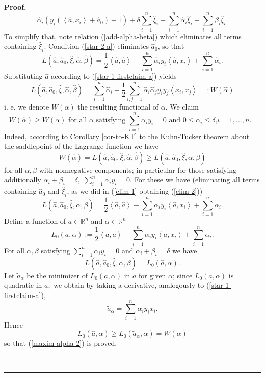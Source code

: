 \documentclass[11pt,twoside]{article}%
\theoremstyle{change}
\newenvironment{proof}[1][Proof]{\textbf{#1.} }{\ \rule{0.5em}{0.5em}}
\begin{document}
\begin{proof}
\begin{equation}
\hat{\alpha}_{i}\left(  y_{i}\left(  \left\langle \hat{a},x_{i}\right\rangle
+\hat{a}_{0}\right)  -1\right)  +\delta\sum_{i=1}^{n}\hat{\xi}_{i}-\sum
_{i=1}^{n}\hat{\alpha}_{i}\hat{\xi}_{i}-\sum_{i=1}^{n}\hat{\beta}_{i}\hat{\xi
}_{i}.\label{elim-1}%
\end{equation}
To simplify that, note relation (\ref{add-alpha-beta}) which eliminates all
terms containing $\hat{\xi}_{i}$. Condition (\ref{star-2-a}) eliminates
$\hat{a}_{0}$, so that
\begin{equation}
L\left(  \hat{a},\hat{a}_{0},\hat{\xi},\hat{\alpha},\hat{\beta}\right)
=\frac{1}{2}\left\langle \hat{a},\hat{a}\right\rangle -\sum_{i=1}^{n}%
\hat{\alpha}_{i}y_{i}\left\langle \hat{a},x_{i}\right\rangle +\sum_{i=1}%
^{n}\hat{\alpha}_{i}.\label{elim-2}%
\end{equation}
Substituting $\hat{a}$ according to (\ref{star-1-firstclaim-a}) yields
\[
L\left(  \hat{a},\hat{a}_{0},\hat{\xi},\hat{\alpha},\hat{\beta}\right)
=\sum_{i=1}^{n}\hat{\alpha}_{i}-\frac{1}{2}\sum_{i,j=1}^{n}\hat{\alpha}%
_{i}\hat{\alpha}_{j}y_{i}y_{j}\left\langle x_{i},x_{j}\right\rangle
=:W(\hat{\alpha})
\]
i. e. we denote $W(\alpha)$ the resulting functional of $\alpha$. We claim
\begin{equation}
W(\hat{\alpha})\geq W(\alpha)\text{ for all }\alpha\text{ satisfying }%
\sum_{i=1}^{n}\alpha_{i}y_{i}=0\text{ and }0\leq\alpha_{i}\leq\delta\text{,
}i=1,\ldots,n.\text{ }\label{maxim-alpha-2}%
\end{equation}
Indeed, according to Corollary \ref{cor-to-KT} to the Kuhn-Tucker theorem
about the saddlepoint of the Lagrange function we have
\[
W(\hat{\alpha})=L\left(  \hat{a},\hat{a}_{0},\hat{\xi},\hat{\alpha},\hat
{\beta}\right)  \geq L\left(  \hat{a},\hat{a}_{0},\hat{\xi},\alpha
,\beta\right)
\]
for all $\alpha,\beta$ with nonnegative components; in particular for those
satisfying additionally $\alpha_{i}+\beta_{i}=\delta,$ $\sum_{i=1}^{n}%
\alpha_{i}y_{i}=0$. For these we have (eliminating all terms containing
$\hat{a}_{0}$ and $\hat{\xi}_{i}$, as we did in (\ref{elim-1} obtaining
(\ref{elim-2}))
\[
L\left(  \hat{a},\hat{a}_{0},\hat{\xi},\alpha,\beta\right)  =\frac{1}%
{2}\left\langle \hat{a},\hat{a}\right\rangle -\sum_{i=1}^{n}\alpha_{i}%
y_{i}\left\langle \hat{a},x_{i}\right\rangle +\sum_{i=1}^{n}\alpha_{i}.
\]
Define a function of $a\in\mathbb{R}^{n}$ and $\alpha\in\mathbb{R}^{n}$
\[
L_{0}\left(  a,\alpha\right)  :=\frac{1}{2}\left\langle a,a\right\rangle
-\sum_{i=1}^{n}\alpha_{i}y_{i}\left\langle a,x_{i}\right\rangle +\sum
_{i=1}^{n}\alpha_{i}.
\]
For all $\alpha,\beta$ satisfying $\sum_{i=1}^{n}\alpha_{i}y_{i}=0$ and
$\alpha_{i}+\beta_{i}=\delta$ we have
\[
L\left(  \hat{a},\hat{a}_{0},\hat{\xi},\alpha,\beta\right)  =L_{0}\left(
\hat{a},\alpha\right)  .
\]
Let $\tilde{a}_{\alpha}$ be the minimizer of $L_{0}\left(  a,\alpha\right)  $
in $a$ for given $\alpha$; since $L_{0}\left(  a,\alpha\right)  $ is quadratic
in $a,$ we obtain by taking a derivative, analogously to
(\ref{star-1-firstclaim-a}),
\[
\tilde{a}_{\alpha}=\sum_{i=1}^{n}\alpha_{i}y_{i}x_{i}.
\]
Hence
\[
L_{0}\left(  \hat{a},\alpha\right)  \geq L_{0}\left(  \tilde{a}_{\alpha
},\alpha\right)  =W(\alpha)
\]
so that (\ref{maxim-alpha-2}) is proved.


\end{proof}
\end{document}
